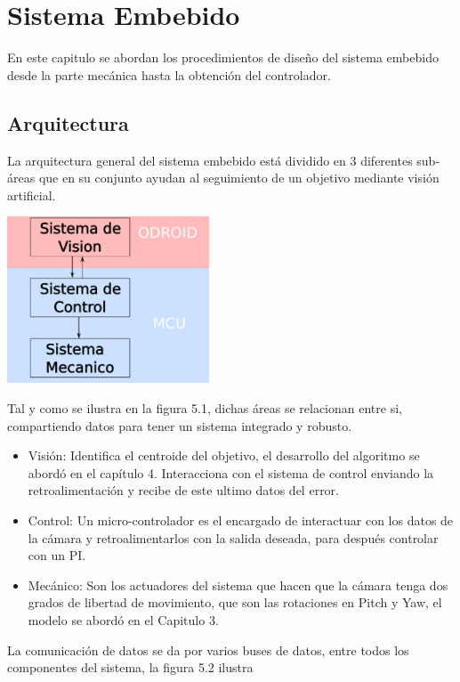 \chapter{Sistema Embebido}

En este capitulo se abordan los procedimientos de diseño del sistema embebido desde la parte mecánica hasta la
obtención del controlador.

\section{Arquitectura}
La arquitectura general del sistema embebido está dividido en 3 diferentes sub-áreas que en su conjunto ayudan al
seguimiento de un objetivo mediante visión artificial.
\begin{center}
	\includegraphics[width=0.45\textwidth]{Contenido/Cuerpo/Capitulo5/Fig12.eps}
	\label{Fig1}
\end{center}
Tal y como se ilustra en la figura 5.1, dichas áreas se relacionan entre si, compartiendo datos para tener un
sistema integrado y robusto.
\begin{itemize}
	\item Visión: Identifica el centroide del objetivo, el desarrollo del algoritmo se abordó en el capítulo 4. Interacciona con el sistema de control enviando la retroalimentación
	      y recibe de este ultimo datos del error.
	\item Control: Un micro-controlador es el encargado de interactuar con los datos de la cámara y retroalimentarlos con la
	      salida deseada, para después controlar con un PI.
	\item Mecánico: Son los actuadores del sistema que hacen que la cámara tenga dos grados de libertad de movimiento, que
	      son las rotaciones en Pitch y Yaw, el modelo se abordó en el Capitulo 3.
\end{itemize}
La comunicación de datos se da por varios buses de datos, entre todos los componentes del sistema, la figura 5.2 ilustra
